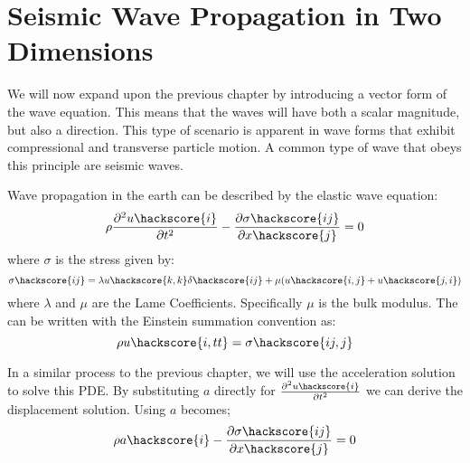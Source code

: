 
%
%
%

\section{Seismic Wave Propagation in Two Dimensions}


We will now expand upon the previous chapter by introducing a vector form of
the wave equation. This means that the waves will have both a scalar magnitude,
but also a direction. This type of scenario is apparent in wave forms that
exhibit compressional and transverse particle motion. A common type of wave
that obeys this principle are seismic waves.

Wave propagation in the earth can be described by the elastic wave equation:
\begin{equation} \label{eqn:wav} \index{wave equation}
\rho \frac{\partial^{2}u\hackscore{i}}{\partial t^2} - \frac{\partial
\sigma\hackscore{ij}}{\partial x\hackscore{j}} = 0
\end{equation}
where $\sigma$ is the stress given by:
\begin{equation} \label{eqn:sigw}
 \sigma \hackscore{ij} = \lambda u\hackscore{k,k} \delta\hackscore{ij} + \mu (
u\hackscore{i,j} + u\hackscore{j,i})
\end{equation}
where $\lambda$ and $\mu$ are the Lame Coefficients. Specifically $\mu$ is the
bulk modulus. The  can be written with the Einstein summation
convention as:
\begin{equation}
\rho u\hackscore{i,tt} = \sigma\hackscore{ij,j}
\end{equation}

In a similar process to the previous chapter, we will use the acceleration
solution to solve this PDE. By substituting $a$ directly for
$\frac{\partial^{2}u\hackscore{i}}{\partial t^2}$ we can derive the
displacement solution. Using $a$  becomes;
\begin{equation} \label{eqn:wava} 
\rho a\hackscore{i} - \frac{\partial
\sigma\hackscore{ij}}{\partial x\hackscore{j}} = 0
\end{equation}

